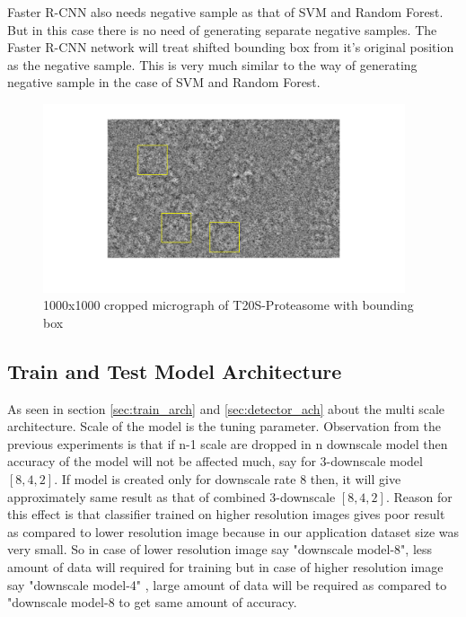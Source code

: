\documentclass[twoside]{iitbreport}
\begin{document}
Faster R-CNN also needs negative sample as that of SVM and Random Forest. But in this case there is no need of generating separate negative samples. The Faster R-CNN network will treat shifted bounding box from it's original position as the negative sample. This is very much similar to the way of generating negative sample in the case of SVM and Random Forest.

\begin{figure}[h]
\includegraphics[width=0.95\textwidth]{fastercnn-EM110025.png}
\centering
\captionsetup{justification=centering}
\caption{1000x1000 cropped micrograph of T20S-Proteasome with bounding box}
\label{fig:fastercnn-EM110025-train}
\end{figure}


\subsection{Train and Test Model Architecture}
As seen in section \ref{sec:train_arch} and \ref{sec:detector_ach} about the multi scale architecture. Scale of the model is the tuning parameter. Observation from the previous experiments is that if n-1 scale are dropped in n downscale model then accuracy of the model will not be affected much, say  for 3-downscale model $[8,4,2]$. If model is created only for downscale rate 8 then, it will give approximately same result as that of combined 3-downscale $[8,4,2]$. Reason for this effect is that classifier trained on higher resolution images gives poor result as compared to lower resolution image because in our application dataset size was very small. So in case of lower resolution image say "downscale model-8", less amount of data will required for training but in case of higher resolution image say "downscale model-4" , large amount of data will be required  as compared to "downscale model-8 to get same amount of accuracy.
\end{document}
